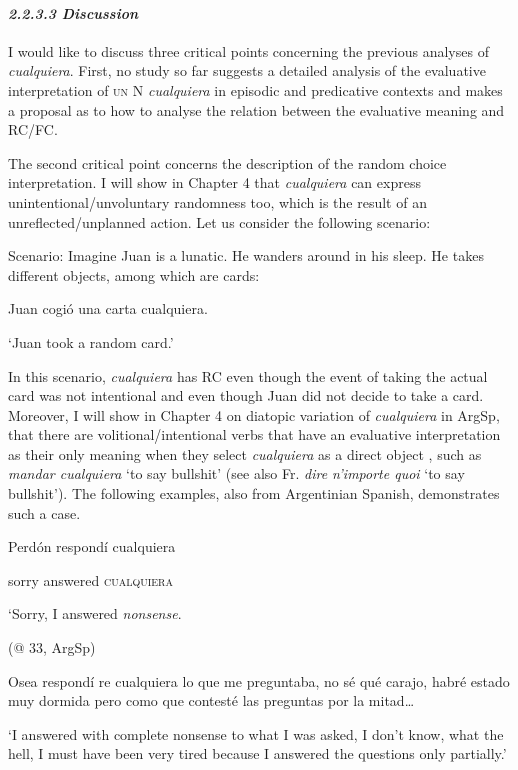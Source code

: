 \documentclass[output=paper]{langscibook}
\begin{document}
\paragraph{\textit{2.2.3.3 Discussion}}

I would like to discuss three critical points concerning the previous analyses of \textit{cualquiera}. First, no study so far suggests a detailed analysis of the evaluative interpretation of \textsc{un} N \textit{cualquiera} in episodic and predicative contexts and makes a proposal as to how to analyse the relation between the evaluative meaning and RC/FC. 

  The second critical point concerns the description of the random choice interpretation. I will show in Chapter 4 that \textit{cualquiera} can express unintentional/unvoluntary randomness too, which is the result of an unreflected/unplanned action. Let us consider the following scenario:

  Scenario: Imagine Juan is a lunatic. He wanders around in his sleep. He takes different objects, among which are cards:

  Juan cogió una carta cualquiera.

  ‘Juan took a random card.’

In this scenario, \textit{cualquiera} has RC even though the event of taking the actual card was not intentional and even though Juan did not decide to take a card. Moreover, I will show in Chapter 4 on diatopic variation of \textit{cualquiera} in ArgSp, that there are volitional/intentional verbs that have an evaluative interpretation as their only meaning when they select \textit{cualquiera} as a direct object , such as \textit{mandar cualquiera} ‘to say bullshit’ (see also Fr. \textit{dire n’importe quoi} ‘to say bullshit’). The following examples, also from Argentinian Spanish, demonstrates such a case.

  Perdón  respondí  cualquiera  

  sorry  answered  \textsc{cualquiera}

  ‘Sorry, I answered \textit{nonsense}. 

  (@ 33,  ArgSp)

  Osea respondí re cualquiera lo que me preguntaba, no sé qué carajo, habré estado muy dormida pero como que contesté las preguntas por la mitad… 

  ‘I answered with complete nonsense to what I was asked, I don’t know, what the hell, I must have been very tired because I answered the questions only partially.’
\end{document}
